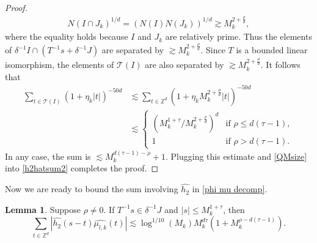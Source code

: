 \documentclass{amsart}
\numberwithin{equation}{section}
\theoremstyle{definition}
\newtheorem{lemma}[theorem]{Lemma}
\theoremstyle{definition}
\def\ZZ{\mathbb{Z}}
\begin{document}
\begin{proof}
\begin{align}
N(I \cap J_k)^{1/d}
=(N(I) N(J_k))^{1/d}
\gtrsim 
M_k^{2+\frac{\rho}{d}}, 
\end{align}
where the equality holds because $I$ and $J_k$ are relatively prime. 
Thus the elements of 
$\delta^{-1} I \cap (T^{-1} s + \delta^{-1} J)$ 
are separated by 
$\gtrsim 
M_k^{2+\frac{\rho}{d}}.$ 
Since $T$ is a bounded linear isomorphism, 
the elements of $\mathcal{T}(I)$ 
are also separated by $\gtrsim M_k^{2+\frac{\rho}{d}}$. 
It follows that 
\begin{align*}
\sum_{t \in \mathcal{T}(I)} (1+\eta_k|t|)^{-50d}
&\lesssim
\sum_{t \in \ZZ^d} (1+\eta_k M_k^{2+\frac{\rho}{d}}|t|)^{-50d} 
\\
&\lesssim 
\left\{\begin{array}{cc}
    (M_k^{1+\tau} / M_k^{2+\frac{\rho}{d}})^d  & \text{if } \rho \leq d(\tau-1),  \\
    1 & \text{if } \rho > d(\tau-1). 
\end{array}\right.
\end{align*}
In any case, the sum is $\lesssim M_k^{d(\tau-1) -\rho}+1$. 
Plugging this estimate and \eqref{QMsize} into \eqref{h2hatsum2} 
completes the proof. 
\end{proof}

Now we are ready to bound the sum involving $\widehat{h_2}$ in \eqref{phi mu decomp}. 


\begin{lemma}
Suppose $\rho \neq 0$. If $T^{-1} s \in \delta^{-1} J$ and $|s| \leq M_k^{1+\tau}$, then 
\begin{equation}\label{h_2_ub}
\sum_{t \in \ZZ^d} |\widehat{h_2}(s-t) \widehat{\mu_{l,k}}(t)| \lesssim \log^{1/10}(M_k) M_k^{d\tau} (1+ M_k^{\rho -d(\tau-1)}).  
\end{equation}
\end{lemma}
\end{document}
